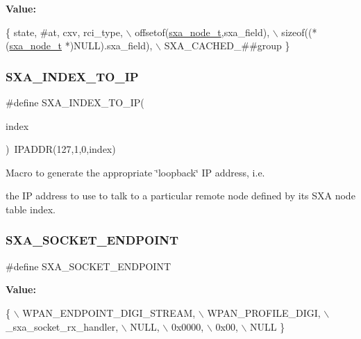{\bfseries Value\+:}
\begin{DoxyCode}
\{ state, #at, cxv, rci\_type, \(\backslash\)
         offsetof(\hyperlink{structsxa__node__t}{sxa\_node\_t},sxa\_field), \(\backslash\)
         sizeof((*(\hyperlink{structsxa__node__t}{sxa\_node\_t} *)NULL).sxa\_field), \(\backslash\)
         SXA\_CACHED\_##group \}
\end{DoxyCode}
\mbox{\label{group___s_x_a_ga0ae330bea7b42c331e9f473387e5766b}} 
\subsubsection{\texorpdfstring{S\+X\+A\+\_\+\+I\+N\+D\+E\+X\+\_\+\+T\+O\+\_\+\+IP}{SXA\_INDEX\_TO\_IP}}
{\footnotesize\ttfamily \#define S\+X\+A\+\_\+\+I\+N\+D\+E\+X\+\_\+\+T\+O\+\_\+\+IP(\begin{DoxyParamCaption}\item[{}]{index }\end{DoxyParamCaption})~I\+P\+A\+D\+DR(127,1,0,index)}



Macro to generate the appropriate \char`\"{}loopback\char`\"{} IP address, i.\+e. 

the IP address to use to talk to a particular remote node defined by its S\+XA node table index. \mbox{\label{group___s_x_a_gacef6e474f41d87ead3269f543f2c5efd}} 
\subsubsection{\texorpdfstring{S\+X\+A\+\_\+\+S\+O\+C\+K\+E\+T\+\_\+\+E\+N\+D\+P\+O\+I\+NT}{SXA\_SOCKET\_ENDPOINT}}
{\footnotesize\ttfamily \#define S\+X\+A\+\_\+\+S\+O\+C\+K\+E\+T\+\_\+\+E\+N\+D\+P\+O\+I\+NT}

{\bfseries Value\+:}
\begin{DoxyCode}
\{ \(\backslash\)
        WPAN\_ENDPOINT\_DIGI\_STREAM,  \(\backslash\)
        WPAN\_PROFILE\_DIGI,          \(\backslash\)
        \_sxa\_socket\_rx\_handler,     \(\backslash\)
        NULL,                       \(\backslash\)
        0x0000,                     \(\backslash\)
        0x00,                       \(\backslash\)
        NULL \}
\end{DoxyCode}


